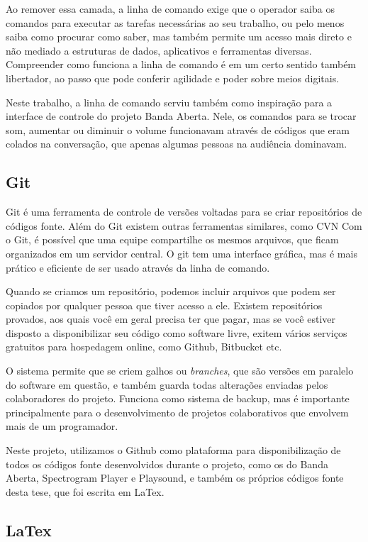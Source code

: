 Ao remover essa camada, a linha de comando exige que o operador saiba os comandos para executar as tarefas necessárias ao seu trabalho, ou pelo menos saiba como procurar como saber, mas também permite um acesso mais direto e não mediado a estruturas de dados, aplicativos e ferramentas diversas. Compreender como funciona a linha de comando é em um certo sentido também libertador, ao passo que pode conferir agilidade e poder sobre meios digitais. 

Neste trabalho, a linha de comando serviu também como inspiração para a interface de controle do projeto Banda Aberta. Nele, os comandos para se trocar som, aumentar ou diminuir o volume funcionavam através de códigos que eram colados na conversação, que apenas algumas pessoas na audiência dominavam. 


\subsection{Git}
Git é uma ferramenta de controle de versões voltadas para se criar repositórios de códigos fonte. Além do Git existem outras ferramentas similares, como CVN Com o Git, é possível que uma equipe compartilhe os mesmos arquivos, que ficam organizados em um servidor central. O git tem uma interface gráfica, mas é mais prático e eficiente de ser usado através da linha de comando. 

Quando se criamos um repositório, podemos incluir arquivos que podem ser copiados por qualquer pessoa que tiver acesso a ele. Existem repositórios provados, aos quais você em geral precisa ter que pagar, mas se você estiver disposto a disponibilizar seu código como software livre, exitem vários serviços gratuitos para hospedagem online, como Github, Bitbucket etc. 

O sistema permite que se criem galhos ou \emph{branches}, que são versões em paralelo do software em questão, e também guarda todas alterações enviadas pelos colaboradores do projeto. Funciona como sistema de backup, mas é importante principalmente para o desenvolvimento de projetos colaborativos que envolvem mais de um programador. 

Neste projeto, utilizamos o Github como plataforma para disponibilização de todos os códigos fonte desenvolvidos durante o projeto, como os do Banda Aberta, Spectrogram Player e Playsound, e também os próprios códigos fonte desta tese, que foi escrita em LaTex.

\subsection{LaTex}

